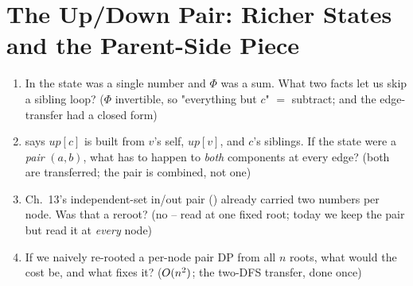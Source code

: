 \section{The Up/Down Pair: Richer States and the Parent-Side Piece}\label{sec:c20-updown}

\begin{previouslybox}
\begin{enumerate}[nosep, leftmargin=1.6em]
  \item In  the state was a single number and $\Phi$ was a
        sum. What two facts let us skip a sibling loop? ($\Phi$ invertible, so
        "everything but $c$" $=$ subtract; and the edge-transfer had a closed
        form)
  \item {} says $\mathit{up}[c]$ is built from
        $v$'s self, $\mathit{up}[v]$, and $c$'s siblings. If the state were a
        \emph{pair} $(a,b)$, what has to happen to \emph{both} components at
        every edge? (both are transferred; the pair is combined, not one)
  \item Ch.~13's independent-set in/out pair () already
        carried two numbers per node. Was that a reroot? (no -- read at one
        fixed root; today we keep the pair but read it at \emph{every} node)
  \item If we naively re-rooted a per-node pair DP from all $n$ roots, what
        would the cost be, and what fixes it? ($O(n^2)$; the two-DFS
        transfer, done once)
\end{enumerate}
\end{previouslybox}

